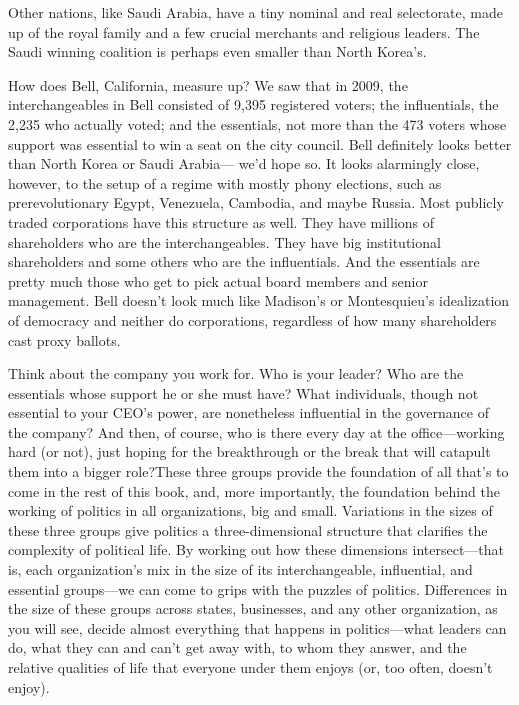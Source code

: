 \documentclass[10pt]{article}
\begin{document}
{\large Other nations, like Saudi Arabia, have a tiny nominal and real
selectorate, made up of the royal family and a few crucial merchants and
religious leaders. The Saudi winning coalition is perhaps even smaller than North
Korea's.}

{\large How does Bell, California, measure up? We saw that in 2009, the
interchangeables in Bell consisted of 9,395 registered voters; the influentials,
the 2,235 who actually voted; and the essentials, not more than the 473 voters
whose support was essential to win a seat on the city council. Bell definitely
looks better than North Korea or Saudi Arabia--- we'd hope so. It looks
alarmingly close, however, to the setup of a regime with mostly phony elections,
such as prerevolutionary Egypt, Venezuela, Cambodia, and maybe Russia. Most
publicly traded corporations have this structure as well. They have millions of
shareholders who are the interchangeables. They have big institutional
shareholders and some others who are the influentials. And the essentials are
pretty much those who get to pick actual board members and senior management.
Bell doesn't look much like Madison's or Montesquieu's idealization of democracy
and neither do corporations, regardless of how many shareholders cast proxy
ballots.}

{\large Think about the company you work for. Who is your leader? Who are the
essentials whose support he or she must have? What individuals, though not
essential to your CEO's power, are nonetheless influential in the governance of
the company? And then, of course, who is there every day at the office---working
hard (or not), just hoping for the breakthrough or the break that will catapult
them into a bigger role?These three groups provide the foundation of all that's
to come in the rest of this book, and, more importantly, the foundation behind
the working of politics in all organizations, big and small. Variations in the
sizes of these three groups give politics a three-dimensional structure that
clarifies the complexity of political life. By working out how these dimensions
intersect---that is, each organization's mix in the size of its interchangeable,
influential, and essential groups---we can come to grips with the puzzles of
politics. Differences in the size of these groups across states, businesses, and
any other organization, as you will see, decide almost everything that happens in
politics---what leaders can do, what they can and can't get away with, to whom
they answer, and the relative qualities of life that everyone under them enjoys
(or, too often, doesn't enjoy).}
\end{document}
